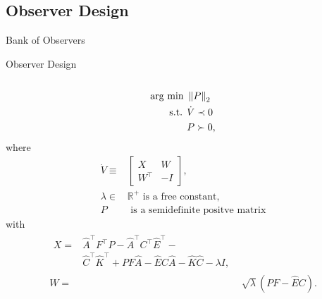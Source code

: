 
\subsection{Observer Design}%
\label{subsec:observer-design}

\begin{slide}{Bank of Observers}
  
\end{slide}

\begin{slide}{Observer Design}
  \begin{columns}[c]
    \begin{column}{0.55\textwidth}
      \begin{equation}
        \begin{aligned}
          \textrm{arg min } & \left\lVert P\right\rVert_{2}    \\
          \textrm{s.t. }    & \dot{V} \prec 0 \\
                            & P \succ 0,
        \end{aligned}
      \end{equation}
      where
      \begin{align}
        \dot{V} \equiv & \begin{bmatrix}
                           X        & W  \\
                           W^{\top} & -I
                         \end{bmatrix},                                         \\
        \lambda\in     & \mathbb{R}^{+} \textrm{ is a free constant}, \nonumber \\
        P              & \textrm{ is a semidefinite positve matrix} \nonumber
      \end{align}
      with
      \begin{align}
        \begin{split}
          X = & \hat{A}^{\top}F^{\top}P - \hat{A}^{\top}C^{\top}\hat{E}^{\top} -                 \\
              & \hat{C}^{\top}\hat{K}^{\top} + PF\hat{A} - \hat{E}C\hat{A} - \hat{K}\hat{C} - \lambda{}I,
        \end{split} \\
        W = & \sqrt{\lambda}(PF - \hat{E}C).
      \end{align}
    \end{column}%

\end{columns}
\end{slide}
